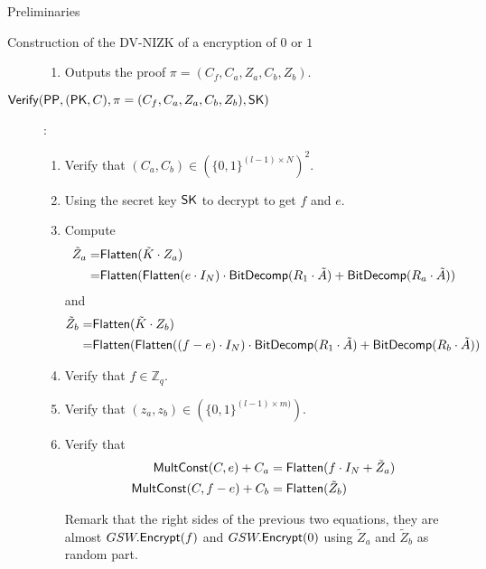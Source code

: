 \begin{section}{Preliminaries}
\begin{subsection}{Construction of the DV-NIZK of a encryption of $0$ or $1$}
\begin{description}
\begin{enumerate}
        \item Outputs the proof $\pi = (C_f, C_a, Z_a, C_b, Z_b)$.
          

        \end{enumerate}

      \item[${\mathsf{Verify}}({\mathsf{PP}}, (\mathsf{PK}, C), \pi = (C_f, C_a, Z_a, C_b, Z_b), \mathsf{SK})$]:
        \begin{enumerate}
        \item Verify that $(C_a, C_b) \in (\{0,1\}^{(l-1) \times N})^2$.
        \item Using the secret key $\mathsf{SK}$ to decrypt to get $f$ and $e$.
        \item Compute
          \begin{align*}
            \tilde{Z}_a = & {\mathsf{Flatten}}(\tilde{K} \cdot Z_a)\\
            = &{\mathsf{Flatten}}({\mathsf{Flatten}}(e \cdot I_N) \cdot {\mathsf{BitDecomp}}(R_1 \cdot \tilde{A}) + {\mathsf{BitDecomp}}(R_a \cdot \tilde{A}))
          \end{align*}
          and
          \begin{align*}
            \tilde{Z}_b = & {\mathsf{Flatten}}(\tilde{K} \cdot Z_b)\\
            = &{\mathsf{Flatten}}({\mathsf{Flatten}}((f-e) \cdot I_N) \cdot {\mathsf{BitDecomp}}(R_1 \cdot \tilde{A}) + {\mathsf{BitDecomp}}(R_b \cdot \tilde{A}))
          \end{align*}

        \item Verify that $f \in \mathbb{Z}_q$.
        \item Verify that $(z_a, z_b) \in  (\{0,1\}^{(l-1) \times m)})$.
        \item Verify that
          \begin{align*}
            {\mathsf{MultConst}}(C, e) + C_a &= {\mathsf{Flatten}}(f \cdot I_N + \tilde{Z}_a)\\
            {\mathsf{MultConst}}(C, f-e) + C_b &= {\mathsf{Flatten}}(\tilde{Z}_b)
          \end{align*}

          Remark that the right sides of the previous two equations, they are almost $GSW.{\mathsf{Encrypt}}(f)$ and $GSW.{\mathsf{Encrypt}}(0)$ using $\tilde{Z}_a$ and $\tilde{Z}_b$ as random part.
        \end{enumerate}
        
    \end{description}


    
    
  \end{subsection}



\end{section}
